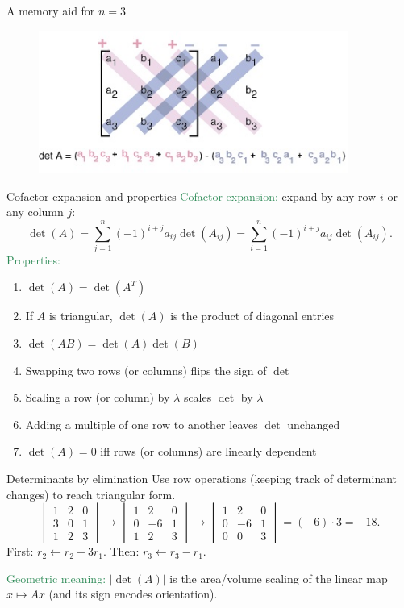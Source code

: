 \documentclass[11pt,aspectratio=169]{beamer}
\begin{document}
\begin{frame}{A memory aid for $n=3$}
\begin{figure}
\includegraphics[width=4in]{img/deter} 
\end{figure}
\end{frame}

\begin{frame}{Cofactor expansion and properties}
\textcolor{SeaGreen}{Cofactor expansion:} expand by any row $i$ or any column $j$:
\[
\det(A)=\sum_{j=1}^n (-1)^{i+j} a_{ij}\det(A_{ij})
=\sum_{i=1}^n (-1)^{i+j} a_{ij}\det(A_{ij}).
\]
\textcolor{SeaGreen}{Properties:}
\begin{enumerate}
\item $\det(A)=\det(A^T)$
\item If $A$ is triangular, $\det(A)$ is the product of diagonal entries
\item $\det(AB)=\det(A)\det(B)$
\item Swapping two rows (or columns) flips the sign of $\det$
\item Scaling a row (or column) by $\lambda$ scales $\det$ by $\lambda$
\item Adding a multiple of one row to another leaves $\det$ unchanged
\item $\det(A)=0$ iff rows (or columns) are linearly dependent
\end{enumerate}
\end{frame}

\begin{frame}{Determinants by elimination}
Use row operations (keeping track of determinant changes) to reach triangular form.
\[
\begin{vmatrix}
1 & 2 & 0\\
3 & 0 & 1\\
1 & 2 & 3
\end{vmatrix}
\to
\begin{vmatrix}
1 & 2 & 0\\
0 & -6 & 1\\
1 & 2 & 3
\end{vmatrix}
\to
\begin{vmatrix}
1 & 2 & 0\\
0 & -6 & 1\\
0 & 0 & 3
\end{vmatrix}
= (-6)\cdot 3 = -18.
\]
{\tiny First: $r_2\leftarrow r_2-3r_1$. Then: $r_3\leftarrow r_3-r_1$.}
\bigskip

\textcolor{SeaGreen}{Geometric meaning:} $|\det(A)|$ is the area/volume scaling of the linear map $x\mapsto Ax$ (and its sign encodes orientation).
\end{frame}
\end{document}
